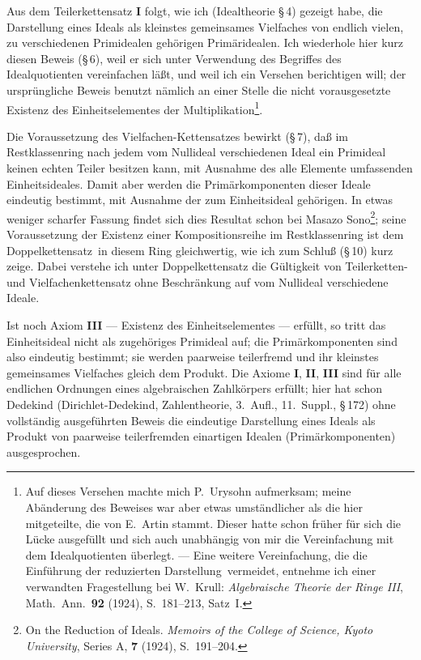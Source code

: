 \documentclass[12pt,a4paper]{article}
\theoremstyle{plain}
\theoremstyle{definition}
\theoremstyle{remark}
\begin{document}
Aus dem Teilerkettensatz \textbf{I} folgt, wie ich (Idealtheorie \S\,4) gezeigt habe, die Darstellung eines Ideals als kleinstes gemeinsames Vielfaches von endlich vielen, zu verschiedenen Primidealen gehörigen Primäridealen. Ich wiederhole hier kurz diesen Beweis (\S\,6), weil er sich unter Verwendung des Begriffes des Idealquotienten vereinfachen läßt, und weil ich ein Versehen berichtigen will; der ursprüngliche Beweis benutzt nämlich an einer Stelle die nicht vorausgesetzte Existenz des Einheitselementes der Multiplikation\footnote{Auf dieses Versehen machte mich P.~Urysohn aufmerksam; meine Abänderung des Beweises war aber etwas umständlicher als die hier mitgeteilte, die von E.~Artin stammt. Dieser hatte schon früher für sich die Lücke ausgefüllt und sich auch unabhängig von mir die Vereinfachung mit dem Idealquotienten überlegt. --- Eine weitere Vereinfachung, die die Einführung der \glqq reduzierten Darstellung\grqq\ vermeidet, entnehme ich einer verwandten Fragestellung bei W.~Krull: \textit{Algebraische Theorie der Ringe III}, Math.\ Ann.\ \textbf{92} (1924), S.~181--213, Satz~I.}.

Die Voraussetzung des Vielfachen-Kettensatzes bewirkt (\S\,7), daß im Restklassenring nach jedem vom Nullideal verschiedenen Ideal ein Primideal keinen echten Teiler besitzen kann, mit Ausnahme des alle Elemente umfassenden Einheitsideales. Damit aber werden die Primärkomponenten dieser Ideale eindeutig bestimmt, mit Ausnahme der zum Einheitsideal gehörigen. In etwas weniger scharfer Fassung findet sich dies Resultat schon bei Masazo Sono\footnote{On the Reduction of Ideals. \textit{Memoirs of the College of Science, Kyoto University}, Series A, \textbf{7} (1924), S.~191--204.}; seine Voraussetzung der Existenz einer Kompositionsreihe im Restklassenring ist dem \glqq Doppelkettensatz\grqq\ in diesem Ring gleichwertig, wie ich zum Schluß (\S\,10) kurz zeige. Dabei verstehe ich unter Doppelkettensatz die Gültigkeit von Teilerketten- und Vielfachenkettensatz ohne Beschränkung auf vom Nullideal verschiedene Ideale.

Ist noch Axiom \textbf{III} --- Existenz des Einheitselementes --- erfüllt, so tritt das Einheitsideal nicht als zugehöriges Primideal auf; die Primärkomponenten sind also eindeutig bestimmt; sie werden paarweise teilerfremd und ihr kleinstes gemeinsames Vielfaches gleich dem Produkt. Die Axiome \textbf{I}, \textbf{II}, \textbf{III} sind für alle endlichen Ordnungen eines algebraischen Zahlkörpers erfüllt; hier hat schon Dedekind (Dirichlet-Dedekind, Zahlentheorie, 3.~Aufl., 11.~Suppl., \S\,172) ohne vollständig ausgeführten Beweis die eindeutige Darstellung eines Ideals als Produkt von paarweise teilerfremden einartigen Idealen (Primärkomponenten) ausgesprochen.
\end{document}
